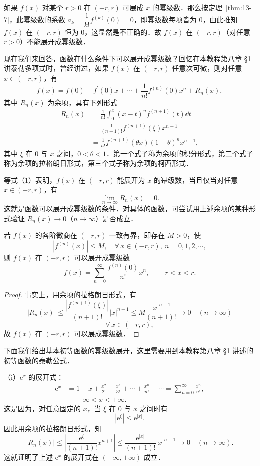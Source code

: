 如果 $f(x)$ 对某个 $r>0$ 在 $(-r,r)$ 可展成 $x$ 的幂级数．那么按定理~\ref{thm:13-7}，此幂级数的系数 $a_{k}=\dfrac{1}{k!}f^{(k)}(0)=0$，即幂级数每项皆为 $0$，由此推知 $f(x)$ 在 $(-r,r)$ 恒为 $0$，这显然是不正确的．故 $f(x)$ 在 $(-r,r)$（对任意 $r>0$）不能展开成幂级数．

现在我们来回答，函数在什么条件下可以展开成幂级数？回忆在本教程第八章 \S1 讲泰勒多项式时，曾经讲过，如果 $f(x)$ 在 $(-r,r)$ 任意次可微，则对任意 $x\in(-r,r)$，有
\begin{equation}
f(x)=f(0)+f^{\prime}(0)x+\cdots+\frac{1}{n!}f^{(n)}(0)x^{n}+R_{n}(x),
\tag{1}
\end{equation}
其中 $R_{n}(x)$ 为余项，具有下列形式
\[
\begin{aligned}
R_{n}(x)&=\frac{1}{n!}\int_{0}^{x}(x-t)^{n}f^{(n+1)}(t)\dd t\\
&=\frac{1}{(n+1)!}f^{(n+1)}(\xi)x^{n+1}\\
&=\frac{1}{n!}f^{(n+1)}(\theta x)(1-\theta)^{n}x^{n+1},
\end{aligned}
\]
其中 $\xi$ 在 $0$ 与 $x$ 之间，$0<\theta<1$．第一个式子称为余项的积分形式，第二个式子称为余项的拉格朗日形式，第三个式子称为余项的柯西形式．

等式（1）表明，$f(x)$ 在 $(-r,r)$ 能展开为 $x$ 的幂级数，当且仅当对任意 $x\in(-r,r)$，有
\[
\lim_{n\to\infty}R_{n}(x)=0.
\]
这就是函数可以展开成幂级数的条件．对具体的函数，可尝试用上述余项的某种形式验证 $R_{n}(x)\to 0$（$n\to\infty$）是否成立．

\begin{theorem}\label{thm:13-8}
若 $f(x)$ 的各阶微商在 $(-r,r)$ 一致有界，即存在 $M>0$，使
\[
\left|f^{(n)}(x)\right|\leqslant M,\quad\forall\,x\in(-r,r),\ n=0,1,2,\cdots,
\]
则 $f(x)$ 在 $(-r,r)$ 可以展开成幂级数
\[
f(x)=\sum_{n=0}^{\infty}\frac{f^{(n)}(0)}{n!}x^{n},\quad -r<x<r.
\]
\end{theorem}

\begin{proof}
事实上，用余项的拉格朗日形式，有
\[
\left|R_{n}(x)\right|\leqslant\frac{\left|f^{(n+1)}(\xi)\right|}{(n+1)!}\left|x\right|^{n+1}\leqslant M\frac{\left|x\right|^{n+1}}{(n+1)!}\to 0\quad(n\to\infty)
\]
\[
\forall\,x\in(-r,r),
\]
故 $f(x)$ 在 $(-r,r)$ 可以展成幂级数．
\end{proof}

下面我们给出基本初等函数的幂级数展开，这里需要用到本教程第八章 \S1 讲述的初等函数的泰勒公式．

（i）$\mathrm{e}^{x}$ 的展开式：
\[
\begin{aligned}
\mathrm{e}^{x}&=1+x+\frac{x^{2}}{2!}+\frac{x^{3}}{3!}+\cdots+\frac{x^{n}}{n!}+\cdots=\sum_{n=0}^{\infty}\frac{x^{n}}{n!},\\
&\quad -\infty<x<+\infty.
\end{aligned}
\]
这是因为，对任意固定的 $x$，当 $\xi$ 在 $0$ 与 $x$ 之间时有
\[
\left|\mathrm{e}^{\xi}\right|\leqslant\mathrm{e}^{\left|x\right|}.
\]
因此用余项的拉格朗日形式，知
\[
\left|R_{n}(x)\right|\leqslant\left|\frac{\mathrm{e}^{\xi}}{(n+1)!}x^{n+1}\right|\leqslant\frac{\mathrm{e}^{\left|x\right|}}{(n+1)!}\left|x\right|^{n+1}\to 0\quad(n\to\infty).
\]
这就证明了上述 $\mathrm{e}^{x}$ 的展开式在 $(-\infty,+\infty)$ 成立．

